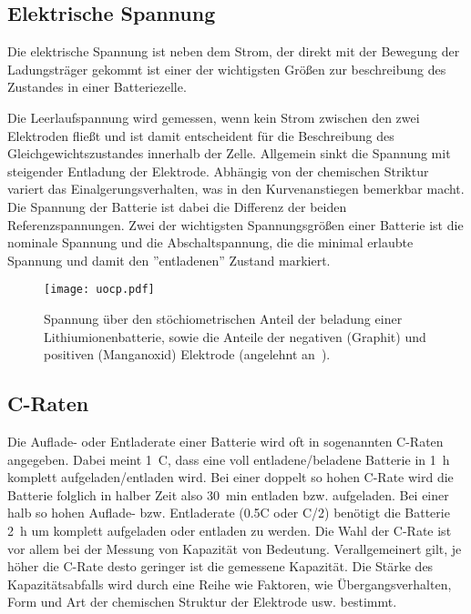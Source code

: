 \subsection{Elektrische Spannung}

Die elektrische Spannung ist neben dem Strom, der direkt mit der Bewegung der Ladungsträger gekommt ist einer der wichtigsten Größen zur beschreibung des Zustandes in einer Batteriezelle. 

Die Leerlaufspannung wird gemessen, wenn kein Strom zwischen den zwei Elektroden fließt und ist damit entscheident für die Beschreibung des Gleichgewichtszustandes innerhalb der Zelle.
Allgemein sinkt die Spannung mit steigender Entladung der Elektrode. Abhängig von der chemischen Striktur variert das Einalgerungsverhalten, was in den Kurvenanstiegen bemerkbar macht.
Die Spannung der Batterie ist dabei die Differenz der beiden Referenzspannungen.
Zwei der wichtigsten Spannungsgrößen einer Batterie ist die nominale Spannung und die Abschaltspannung, die die minimal erlaubte Spannung und damit den ''entladenen'' Zustand markiert.

\begin{figure}[h]
        \center
	\texttt{[image: uocp.pdf]}
		\caption{\label{fig:battery_voltage}Spannung über den stöchiometrischen Anteil der beladung einer Lithiumionenbatterie, sowie die Anteile der negativen (Graphit) und positiven (Manganoxid) Elektrode (angelehnt an~\cite{Newman2021}).}
\end{figure}

\subsection{C-Raten}
Die Auflade- oder Entladerate einer Batterie wird oft in sogenannten C-Raten angegeben. Dabei meint 1~C, dass eine voll entladene/beladene Batterie in 1~h komplett aufgeladen/entladen wird. Bei einer doppelt so hohen C-Rate wird die Batterie folglich in halber Zeit also 30~min entladen bzw. aufgeladen. Bei einer halb so hohen Auflade- bzw. Entladerate (0.5C oder C/2) benötigt die Batterie 2~h um komplett aufgeladen oder entladen zu werden.
Die Wahl der C-Rate ist vor allem bei der Messung von Kapazität von Bedeutung.
Verallgemeinert gilt, je höher die C-Rate desto geringer ist die gemessene Kapazität. Die Stärke des Kapazitätsabfalls wird durch eine Reihe wie Faktoren, wie Übergangsverhalten, Form und Art der chemischen Struktur der Elektrode usw. bestimmt.

